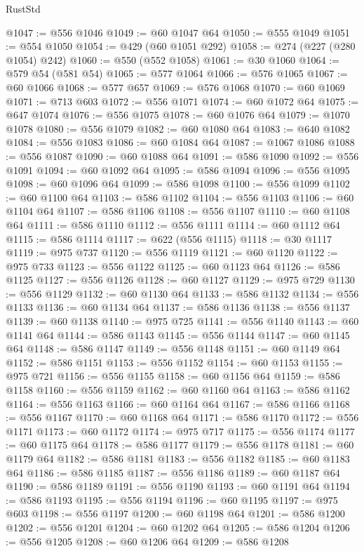 \begin{lexlean}{RustStd}
\begin{coremodule}
{\begin{coremodule}
{{{{{{{{{{{{{{{{{{{{{{{{{{{{{@1047 := @556 @1046
@1049 := @60 @1047 @64
@1050 := @555 @1049
@1051 := @554 @1050
@1054 := @429 (@60 @1051 @292)
@1058 := @274 (@227 (@280 @1054) @242)
@1060 := @550 (@552 @1058)
@1061 := @30 @1060
@1064 := @579 @54 (@581 @54)
@1065 := @577 @1064
@1066 := @576 @1065
@1067 := @60 @1066
@1068 := @577 @657
@1069 := @576 @1068
@1070 := @60 @1069
@1071 := @713 @603
@1072 := @556 @1071
@1074 := @60 @1072 @64
@1075 := @647 @1074
@1076 := @556 @1075
@1078 := @60 @1076 @64
@1079 := @1070 @1078
@1080 := @556 @1079
@1082 := @60 @1080 @64
@1083 := @640 @1082
@1084 := @556 @1083
@1086 := @60 @1084 @64
@1087 := @1067 @1086
@1088 := @556 @1087
@1090 := @60 @1088 @64
@1091 := @586 @1090
@1092 := @556 @1091
@1094 := @60 @1092 @64
@1095 := @586 @1094
@1096 := @556 @1095
@1098 := @60 @1096 @64
@1099 := @586 @1098
@1100 := @556 @1099
@1102 := @60 @1100 @64
@1103 := @586 @1102
@1104 := @556 @1103
@1106 := @60 @1104 @64
@1107 := @586 @1106
@1108 := @556 @1107
@1110 := @60 @1108 @64
@1111 := @586 @1110
@1112 := @556 @1111
@1114 := @60 @1112 @64
@1115 := @586 @1114
@1117 := @622 (@556 @1115)
@1118 := @30 @1117
@1119 := @975 @737
@1120 := @556 @1119
@1121 := @60 @1120
@1122 := @975 @733
@1123 := @556 @1122
@1125 := @60 @1123 @64
@1126 := @586 @1125
@1127 := @556 @1126
@1128 := @60 @1127
@1129 := @975 @729
@1130 := @556 @1129
@1132 := @60 @1130 @64
@1133 := @586 @1132
@1134 := @556 @1133
@1136 := @60 @1134 @64
@1137 := @586 @1136
@1138 := @556 @1137
@1139 := @60 @1138
@1140 := @975 @725
@1141 := @556 @1140
@1143 := @60 @1141 @64
@1144 := @586 @1143
@1145 := @556 @1144
@1147 := @60 @1145 @64
@1148 := @586 @1147
@1149 := @556 @1148
@1151 := @60 @1149 @64
@1152 := @586 @1151
@1153 := @556 @1152
@1154 := @60 @1153
@1155 := @975 @721
@1156 := @556 @1155
@1158 := @60 @1156 @64
@1159 := @586 @1158
@1160 := @556 @1159
@1162 := @60 @1160 @64
@1163 := @586 @1162
@1164 := @556 @1163
@1166 := @60 @1164 @64
@1167 := @586 @1166
@1168 := @556 @1167
@1170 := @60 @1168 @64
@1171 := @586 @1170
@1172 := @556 @1171
@1173 := @60 @1172
@1174 := @975 @717
@1175 := @556 @1174
@1177 := @60 @1175 @64
@1178 := @586 @1177
@1179 := @556 @1178
@1181 := @60 @1179 @64
@1182 := @586 @1181
@1183 := @556 @1182
@1185 := @60 @1183 @64
@1186 := @586 @1185
@1187 := @556 @1186
@1189 := @60 @1187 @64
@1190 := @586 @1189
@1191 := @556 @1190
@1193 := @60 @1191 @64
@1194 := @586 @1193
@1195 := @556 @1194
@1196 := @60 @1195
@1197 := @975 @603
@1198 := @556 @1197
@1200 := @60 @1198 @64
@1201 := @586 @1200
@1202 := @556 @1201
@1204 := @60 @1202 @64
@1205 := @586 @1204
@1206 := @556 @1205
@1208 := @60 @1206 @64
@1209 := @586 @1208
}}}}}}}}}}}}}}}}}}}}}}}}}}}}}
\end{coremodule}}
\end{coremodule}
\end{lexlean}
